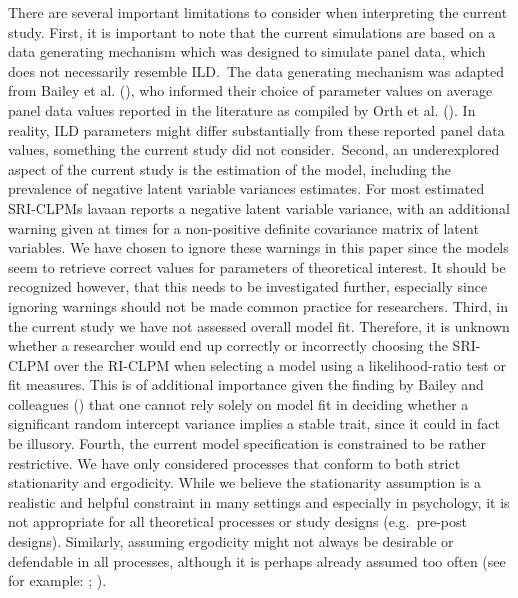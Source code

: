 \documentclass[
  man,
  floatsintext,
  longtable,
  nolmodern,
  notxfonts,
  notimes,
  colorlinks=true,linkcolor=blue,citecolor=blue,urlcolor=blue]{apa7}
\begin{document}
There are several important limitations to consider when interpreting
the current study. First, it is important to note that the current
simulations are based on a data generating mechanism which was designed
to simulate panel data, which does not necessarily resemble ILD.~The
data generating mechanism was adapted from Bailey et al.
(), who informed their
choice of parameter values on average panel data values reported in the
literature as compiled by Orth et al.
(). In reality,
ILD parameters might differ substantially from these reported panel data
values, something the current study did not consider.~Second, an
underexplored aspect of the current study is the estimation of the
model, including the prevalence of negative latent variable variances
estimates. For most estimated SRI-CLPMs lavaan reports a negative latent
variable variance, with an additional warning given at times for a
non-positive definite covariance matrix of latent variables. We have
chosen to ignore these warnings in this paper since the models seem to
retrieve correct values for parameters of theoretical interest. It
should be recognized however, that this needs to be investigated
further, especially since ignoring warnings should not be made common
practice for researchers. Third, in the current study we have not
assessed overall model fit. Therefore, it is unknown whether a
researcher would end up correctly or incorrectly choosing the SRI-CLPM
over the RI-CLPM when selecting a model using a likelihood-ratio test or
fit measures. This is of additional importance given the finding by
Bailey and colleagues
() that one cannot
rely solely on model fit in deciding whether a significant random
intercept variance implies a stable trait, since it could in fact be
illusory. Fourth, the current model specification is constrained to be
rather restrictive. We have only considered processes that conform to
both strict stationarity and ergodicity. While we believe the
stationarity assumption is a realistic and helpful constraint in many
settings and especially in psychology, it is not appropriate for all
theoretical processes or study designs (e.g.~pre-post designs).
Similarly, assuming ergodicity might not always be desirable or
defendable in all processes, although it is perhaps already assumed too
often (see for example:
; ).
\end{document}
